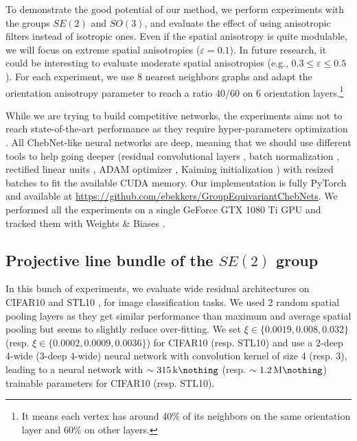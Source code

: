 \documentclass{article}
\newcommand{\haguettaz}[1]{{\color[rgb]{.8,.3,.2}{#1}}}
\begin{document}
\haguettaz{\subsection{How scalable is the method?}}

To demonstrate the good potential of our method, we perform experiments with the groups $SE(2)$ and $SO(3)$, and evaluate the effect of using anisotropic filters instead of isotropic ones. Even if the spatial anisotropy is quite modulable, we will focus on extreme spatial anisotropies ($\varepsilon = 0.1$). In future research, it could be interesting to evaluate moderate spatial anisotropies (e.g., $0.3 \leq \varepsilon \leq 0.5$). For each experiment, we use 8 nearest neighbors graphs and adapt the orientation anisotropy parameter to reach a ratio 40/60 on 6 orientation layers.\footnote{It means each vertex has around 40\% of its neighbors on the same orientation layer and 60\% on other layers.} 

While we are trying to build competitive networks, the experiments aims not to reach state-of-the-art performance as they require hyper-parameters optimization \citep{yu2020hyper}. All ChebNet-like neural networks are deep, meaning that we should use different tools to help going deeper (residual convolutional layers \citep{he2016deep}, batch normalization \citep{ioffe2015batch}, rectified linear units \citep{nair2010rectified}, ADAM optimizer \citep{kingma2014adam},  Kaiming initialization \citep{he2015delving}) with resized batches to fit the available CUDA memory. Our implementation is fully PyTorch \citep{pytorch} and available at \url{https://github.com/ebekkers/GroupEquivariantChebNets}. We performed all the experiments on a single GeForce GTX 1080 Ti GPU and tracked them with Weights \& Biases \citep{wandb}. 

\subsection{Projective line bundle of the $SE(2)$ group}

In this bunch of experiments, we evaluate wide residual architectures \citep{zagoruyko2016wide} on CIFAR10 \citep{krizhevsky2009learning} and STL10 \citep{coates2011analysis}, for image classification tasks. We used 2 random spatial pooling layers as they get similar performance than maximum and average spatial pooling but seems to slightly reduce over-fitting. We set $\xi \in \{0.0019, 0.008, 0.032\}$ (resp. $\xi \in \{0.0002, 0.0009, 0.0036\}$) for CIFAR10 (resp. STL10) and use a 2-deep 4-wide (3-deep 4-wide) neural network with convolution kernel of size 4 (resp. 3), leading to a neural network with $\sim \SI{315}{\kilo\nothing}$ (resp. $\sim \SI{1.2}{\mega\nothing}$) trainable parameters for CIFAR10 (resp. STL10).
\end{document}
